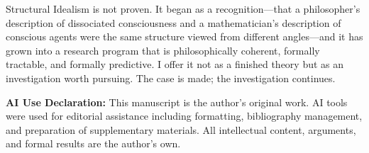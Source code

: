 \documentclass[11pt,a4paper]{article}
\theoremstyle{definition}
\theoremstyle{plain}
\theoremstyle{remark}
\begin{document}
Structural Idealism is not proven. It began as a recognition---that a philosopher's description of dissociated consciousness and a mathematician's description of conscious agents were the same structure viewed from different angles---and it has grown into a research program that is philosophically coherent, formally tractable, and formally predictive. I offer it not as a finished theory but as an investigation worth pursuing. The case is made; the investigation continues.

\vspace{2em}
\noindent\textbf{AI Use Declaration:} This manuscript is the author's original work. AI tools were used for editorial assistance including formatting, bibliography management, and preparation of supplementary materials. All intellectual content, arguments, and formal results are the author's own.
\end{document}
